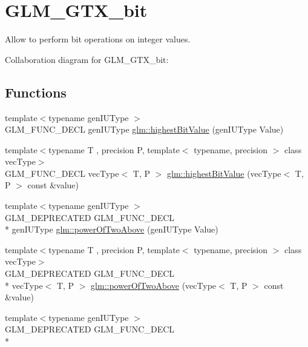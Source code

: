 \hypertarget{group__gtx__bit}{\section{G\-L\-M\-\_\-\-G\-T\-X\-\_\-bit}
\label{group__gtx__bit}
}


Allow to perform bit operations on integer values.  


Collaboration diagram for G\-L\-M\-\_\-\-G\-T\-X\-\_\-bit\-:
\subsection*{Functions}
\begin{DoxyCompactItemize}
\item 
{\footnotesize template$<$typename gen\-I\-U\-Type $>$ }\\G\-L\-M\-\_\-\-F\-U\-N\-C\-\_\-\-D\-E\-C\-L gen\-I\-U\-Type \hyperlink{group__gtx__bit_ga0dcc8fe7c3d3ad60dea409281efa3d05}{glm\-::highest\-Bit\-Value} (gen\-I\-U\-Type Value)
\item 
{\footnotesize template$<$typename T , precision P, template$<$ typename, precision $>$ class vec\-Type$>$ }\\G\-L\-M\-\_\-\-F\-U\-N\-C\-\_\-\-D\-E\-C\-L vec\-Type$<$ T, P $>$ \hyperlink{group__gtx__bit_ga5eea3a4d429040af13d39a7d7cd84d73}{glm\-::highest\-Bit\-Value} (vec\-Type$<$ T, P $>$ const \&value)
\item 
{\footnotesize template$<$typename gen\-I\-U\-Type $>$ }\\G\-L\-M\-\_\-\-D\-E\-P\-R\-E\-C\-A\-T\-E\-D G\-L\-M\-\_\-\-F\-U\-N\-C\-\_\-\-D\-E\-C\-L \\*
gen\-I\-U\-Type \hyperlink{group__gtx__bit_ga8cda2459871f574a0aecbe702ac93291}{glm\-::power\-Of\-Two\-Above} (gen\-I\-U\-Type Value)
\item 
{\footnotesize template$<$typename T , precision P, template$<$ typename, precision $>$ class vec\-Type$>$ }\\G\-L\-M\-\_\-\-D\-E\-P\-R\-E\-C\-A\-T\-E\-D G\-L\-M\-\_\-\-F\-U\-N\-C\-\_\-\-D\-E\-C\-L \\*
vec\-Type$<$ T, P $>$ \hyperlink{group__gtx__bit_gafe08808a50226b75b50e640a08b32ddc}{glm\-::power\-Of\-Two\-Above} (vec\-Type$<$ T, P $>$ const \&value)
\item 
{\footnotesize template$<$typename gen\-I\-U\-Type $>$ }\\G\-L\-M\-\_\-\-D\-E\-P\-R\-E\-C\-A\-T\-E\-D G\-L\-M\-\_\-\-F\-U\-N\-C\-\_\-\-D\-E\-C\-L \\*

\end{DoxyCompactItemize}
